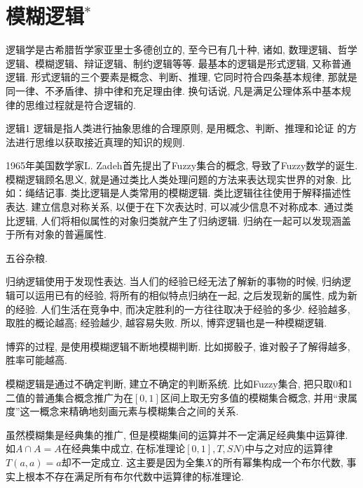 \section{模糊逻辑$^*$}
    逻辑学是古希腊哲学家亚里士多德创立的, 至今已有几十种, 诸如, 数理逻辑、哲学逻辑、模糊逻辑、辩证逻辑、制约逻辑等等. 最基本的逻辑是形式逻辑, 又称普通逻辑. 形式逻辑的三个要素是概念、判断、推理, 它同时符合四条基本规律, 那就是同一律、不矛盾律、排中律和充足理由律. 换句话说, 凡是满足公理体系中基本规律的思维过程就是符合逻辑的.

\begin{mydef}{逻辑}{1}
    逻辑是指人类进行抽象思维的合理原则, 是用概念、判断、推理和论证 的方法进行思维以获取接近真理的知识的规则.
\end{mydef}

1965年美国数学家L. Zadeh首先提出了Fuzzy集合的概念, 导致了Fuzzy数学的诞生.
模糊逻辑顾名思义, 就是通过类比人类处理问题的方法来表达现实世界的对象. 比如：绳结记事. 类比逻辑是人类常用的模糊逻辑.
类比逻辑往往使用于解释描述性表达. 建立信息对称关系, 以便于在下次表达时, 可以减少信息不对称成本.
通过类比逻辑, 人们将相似属性的对象归类就产生了归纳逻辑. 归纳在一起可以发现涵盖于所有对象的普遍属性.
\begin{example}
    五谷杂粮.
\end{example}

归纳逻辑使用于发现性表达. 当人们的经验已经无法了解新的事物的时候, 归纳逻辑可以运用已有的经验, 将所有的相似特点归纳在一起, 之后发现新的属性, 成为新的经验.
人们生活在竞争中, 而决定胜利的一方往往取决于经验的多少. 经验越多, 取胜的概论越高; 经验越少, 越容易失败. 所以, 博弈逻辑也是一种模糊逻辑.
\begin{remark}
    博弈的过程, 是使用模糊逻辑不断地模糊判断. 比如掷骰子, 谁对骰子了解得越多, 胜率可能越高.
\end{remark}

模糊逻辑是通过不确定判断, 建立不确定的判断系统. 比如Fuzzy集合, 把只取0和1二值的普通集合概念推广为在$[0, 1]$区间上取无穷多值的模糊集合概念, 并用“隶属度”这一概念来精确地刻画元素与模糊集合之间的关系.
\begin{remark}
虽然模糊集是经典集的推广, 但是模糊集间的运算并不一定满足经典集中运算律.
如$A\cap A=A$在经典集中成立, 在标准理论$[0,1],T,SN)$中与之对应的运算律$T(a,a)=a$却不一定成立.
这主要是因为全集$X$的所有幂集构成一个布尔代数, 事实上根本不存在满足所有布尔代数中运算律的标准理论. 
\end{remark}

